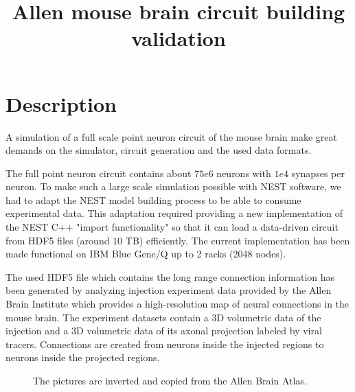 \documentclass[a4paper]{IEEEtran}
\title{ Allen mouse brain circuit building validation}
\begin{document}
   \maketitle
   
   \section{Description}
   A simulation of a full scale point neuron circuit of the mouse brain make great demands on the simulator, circuit generation and the used data formats.   
   
   The full point neuron circuit contains about $75e6$ neurons with $1e4$ synapses per neuron.
   To make such a large scale simulation possible with NEST software, we had to adapt the NEST model building process to be able to consume
experimental data. This adaptation required providing a new implementation of the NEST C++ "import functionality" so that it can load a data-driven circuit from HDF5 files (around $10$ TB) efficiently. The current implementation has been made functional on IBM Blue Gene/Q up to 2 racks (2048 nodes).   

The used HDF5 file which contains the long range connection information has been generated by analyzing injection experiment data provided by the 
Allen Brain Institute which provides a high-resolution map of neural connections in the mouse brain.
The experiment datasets contain a 3D volumetric data of the injection and a 3D volumetric data of its axonal projection labeled by viral
   tracers. Connections are created from neurons inside the injected regions to neurons inside the projected regions.
  
	 \begin{figure}[ht!]
   	\begin{center}
        \hspace{0.1cm}
    	   \end{center}
    	\caption{%
        The pictures are inverted and copied from the Allen Brain Atlas.
     }%
   \label{fig:atlas}
   \end{figure}  
  
\end{document}
